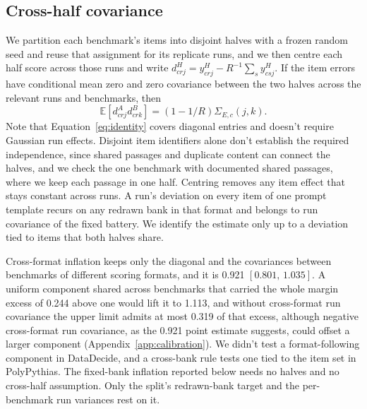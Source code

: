 \documentclass{article}
\newcommand{\ci}[2]{\ensuremath{[#1,\,#2]}}
\begin{document}
\subsection{Cross-half covariance}
We partition each benchmark's items into disjoint halves with a frozen random seed and reuse that assignment for its replicate runs, and we then centre each half score across those runs and write $d^H_{crj}=y^H_{crj}-R^{-1}\sum_s y^H_{csj}$. If the item errors have conditional mean zero and zero covariance between the two halves across the relevant runs and benchmarks, then
\begin{equation}
\mathbb{E}[d^A_{crj}d^B_{crk}]=(1-1/R)\Sigma_{E,c}(j,k).
\label{eq:identity}
\end{equation}
Note that Equation~\ref{eq:identity} covers diagonal entries and doesn't require Gaussian run effects. Disjoint item identifiers alone don't establish the required independence, since shared passages and duplicate content can connect the halves, and we check the one benchmark with documented shared passages, where we keep each passage in one half. Centring removes any item effect that stays constant across runs. A run's deviation on every item of one prompt template recurs on any redrawn bank in that format and belongs to run covariance of the fixed battery. We identify the estimate only up to a deviation tied to items that both halves share.

Cross-format inflation keeps only the diagonal and the covariances between benchmarks of different scoring formats, and it is 0.921 \ci{0.801}{1.035}. A uniform component shared across benchmarks that carried the whole margin excess of 0.244 above one would lift it to 1.113, and without cross-format run covariance the upper limit admits at most 0.319 of that excess, although negative cross-format run covariance, as the 0.921 point estimate suggests, could offset a larger component (Appendix~\ref{app:calibration}). We didn't test a format-following component in DataDecide, and a cross-bank rule tests one tied to the item set in PolyPythias. The fixed-bank inflation reported below needs no halves and no cross-half assumption. Only the split's redrawn-bank target and the per-benchmark run variances rest on it.
\end{document}
